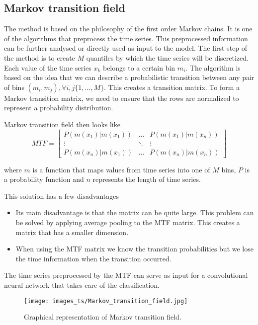 \documentclass[thesis=M,english]{FITthesis}[2019/12/23]
\begin{document}
\clearpage
\subsection{Markov transition field}
The method is based on the philosophy of the first order Markov chains. It is one of the algorithms that preprocess the time series. This preprocessed information can be further analysed or directly used as input to the model.
The first step of the method is to create $M$ quantiles by which the time series will be discretized. Each value of the time series $x_k$ belongs to a certain bin $m_i$. The algorithm is based on the idea that we can describe a probabilistic transition between any pair of bins $(m_i,m_j), \forall i,j \{1,\dots,M\}$. This creates a transition matrix. To form a Markov transition matrix, we need to ensure that the rows are normalized to represent a probability distribution.

Markov transition field then looks like
\[
MTF = \begin{bmatrix} 
    P(m(x_1)|m(x_1)) & \dots & P(m(x_1)|m(x_n)) \\
    \vdots & \ddots & \vdots \\
    P(m(x_n)|m(x_1)) & \dots  & P(m(x_n)|m(x_n)) 
    \end{bmatrix}
\]


where $m$ is a function that maps values from time series into one of $M$ bins, $P$ is a probability function and $n$ represents the length of time series. 

This solution has a few disadvantages
\begin{itemize}
		\item Its main disadvantage is that the matrix can be quite large. This problem can be solved by applying average pooling to the MTF matrix. This creates a matrix that has a smaller dimension.
		\item When using the MTF matrix we know the transition probabilities but we lose the time information when the transition occurred.
	\end{itemize}

The time series preprocessed by the MTF can serve as input for a convolutional neural network that takes care of the classification.

\begin{figure}[ht!]
    \centering
    \texttt{[image: images\_ts/Markov\_transition\_field.jpg]}
    \caption{Graphical representation of Markov transition field.}
    \label{fig:graphic_markov_transition_field}
\end{figure}
\end{document}
